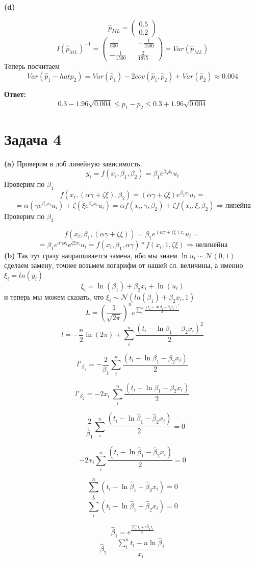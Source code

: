 \documentclass[a4paper, 12pt]{article} %
\begin{document}
\textbf{(d)}

\[
    \hat p_{ML} = \begin{pmatrix}
        0.5 \\ 0.2
    \end{pmatrix}
    \]
\[
I(\hat p_{ML})^{-1} = \begin{pmatrix}
    \frac{1}{600} && -\frac{1}{1500} \\
    - \frac{1}{1500} && \frac{2}{1875}
\end{pmatrix}  = Var(\hat p_{ML})
\]
Теперь посчитаем 
\[
    Var(\hat p_1 - hat p_2) = Var(\hat p_1) - 2cov(\hat p_1, \hat p_2) + Var(\hat p_2) \approx 0.004
\]

\textbf{Ответ:}
\[0.3 - 1.96\sqrt{0.004} \leq p_1 - p_2 \leq 0.3 + 1.96\sqrt{0.004}\]

\section*{Задача 4}
\textbf{(a)}
Проверим в лоб линейную зависимость.
\[
y_i = f(x_i, \beta_1, \beta_2) = \beta_1 e^{\beta_2x_i}u_i    
\]
Проверим по $\beta_1$
\[
f(x_i, (\alpha\gamma + \zeta\xi), \beta_2) = (\alpha\gamma + \zeta\xi)e^{\beta_2x_i}u_i =
\]
\[
   = \alpha(\gamma e^{\beta_2x_i}u_i) + \zeta(\xi e^{\beta_2x_i}u_i) = 
   \alpha f(x_i, \gamma, \beta_2) + \zeta f(x_i, \xi, \beta_2) \Rightarrow линейна
\]
Проверим по $\beta_2$

\[
f(x_i, \beta_1, (\alpha\gamma + \zeta\xi)) = \beta_1 e^{(\alpha\gamma + \zeta\xi)x_i}u_i =
\]
\[
   = \beta_1 e^{\alpha\gamma x_i} e^{\zeta\xi x_i}u_i = 
   f(x_i, \beta_1, \alpha\gamma) * f(x_i, 1, \zeta\xi) \Rightarrow нелинейна
\]
\textbf{(b)}
Так тут сразу напрашивается замена, ибо мы знаем $\ln u_i \sim  \mathcal{N}(0, 1) $
сделаем замену, точнее возьмем логарифм от нашей сл. величины, а именно $\xi_i = ln(y_i)$
\[
\xi_i = \ln(\beta_1) + \beta_2x_i + \ln(u_i)
 \]   
и  теперь мы можем сказать, что 
$\xi_i  \sim  \mathcal{N}(ln(\beta_1) + \beta_2x_i, 1)$
\[
L = \left( \frac{1}{\sqrt{2\pi}}\right) ^ n e^{\sum_i^n\frac{(t_i - \ln\beta_1 - \beta_2x_i)^2}{2} }
\]
\[
l = -\frac{n}{2}\ln(2\pi) + \sum_i^n\frac{(t_i - \ln\beta_1 - \beta_2x_i)^2}{2} 
\]

\[
l'_{\beta_1} = -\frac{2}{\beta_1} \sum_i^n\frac{(t_i - \ln\beta_1 - \beta_2x_i)}{2}
\]

\[
l'_{\beta_2} = -{2x_i}\ \sum_i^n\frac{(t_i - \ln\beta_1 - \beta_2x_i)}{2}
\]


\[
    - \frac{2}{\hat \beta_1} \sum_i^n\frac{(t_i - \ln\hat \beta_1 - \hat \beta_2x_i)}{2} = 0 
    \]

\[-2x_i \sum_i^n\frac{(t_i - \ln\hat \beta_1 - \hat \beta_2x_i)}{2} = 0
\]

\[
     \sum_i^n (t_i - \ln\hat \beta_1 - \hat \beta_2x_i) = 0 \]
    \[ \sum_i^n (t_i - \ln\hat \beta_1 - \hat \beta_2x_i) = 0
\]


\[
    \hat \beta_1 = e^{\frac{\sum_i^n t_i + n\hat \beta_2x_i}{n}}
    \]
\[ \hat \beta_2 = \frac{\sum_i^n t_i - n\ln\hat \beta_1}{x_i}
\]
\end{document}
